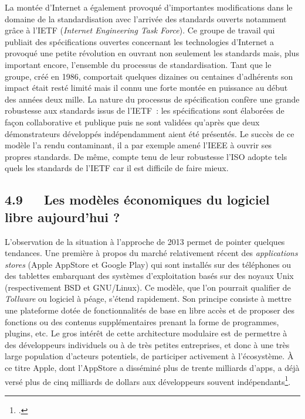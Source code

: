 \documentclass{FramateX}
\begin{document}
\begin{refsection}
La montée d'Internet a également provoqué d'importantes modifications
dans le domaine de la standardisation avec l'arrivée des standards
ouverts notamment grâce à l'IETF (\textit{Internet Engineering Task
Force}). Ce groupe de travail qui publiait des spécifications ouvertes
concernant les technologies d'Internet a provoqué une
petite révolution en ouvrant non seulement les standards mais, plus
important encore, l'ensemble du processus de standardisation. Tant que
le groupe, créé en 1986, comportait quelques dizaines ou centaines
d'adhérents son impact était resté limité mais il connu une forte
montée en puissance au début des années deux mille. La nature du
processus de spécification confère une grande robustesse aux standards
issus de l'IETF~: les spécifications sont élaborées de façon
collaborative et publique puis ne sont validées
qu'après que deux démonstrateurs développés
indépendamment aient été présentés. Le succès de ce modèle l'a rendu
contaminant, il a par exemple amené l'IEEE à ouvrir ses propres
standards. De même, compte tenu de leur robustesse
l'ISO adopte tels quels les standards de
l'IETF car il est difficile de faire mieux.

\subsection*{4.9~~~Les modèles économiques du logiciel libre aujourd'hui ?}
{}

L'observation de la situation à l'approche de 2013
permet de pointer quelques tendances. Une première à propos du marché
relativement récent des \textit{applications stores} (Apple AppStore et
Google Play) qui sont installés sur des téléphones ou des tablettes
embarquant des systèmes d'exploitation basés sur des noyaux Unix
(respectivement BSD et GNU/Linux). Ce modèle, que l'on pourrait
qualifier de~ \textit{Tollware} ou logiciel à péage, s'étend
rapidement. Son principe consiste à mettre une plateforme dotée de
fonctionnalités de base en libre accès et de proposer des fonctions ou
des contenus supplémentaires prenant la forme de programmes, plugins,
etc. Le gros intérêt de cette architecture modulaire est de permettre à
des développeurs individuels ou à de très petites entreprises, et donc
à une très large population d'acteurs potentiels, de
participer activement à l'écosystème. À ce titre Apple, dont l'AppStore
a disséminé plus de trente milliards d'apps, a déjà versé plus de cinq
milliards de dollars aux développeurs souvent indépendants\footnote{\cite{dediuios2012}.}.


\end{refsection}
\end{document}

